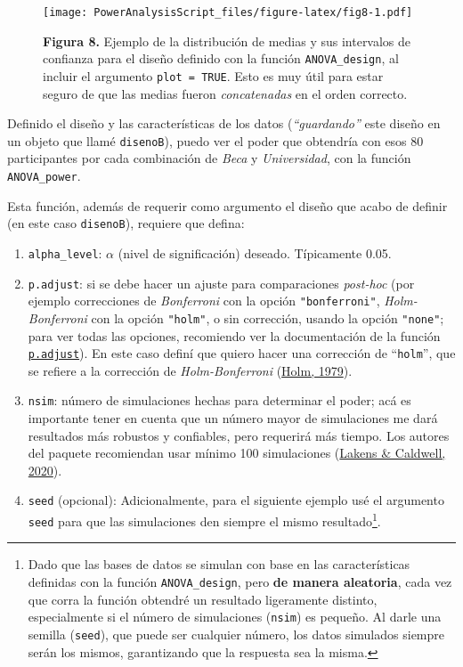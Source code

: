 \documentclass[
]{article}
\providecommand{\tightlist}{%
  \setlength{\itemsep}{0pt}\setlength{\parskip}{0pt}}
\begin{document}
\begin{figure}
\centering
\texttt{[image: PowerAnalysisScript\_files/figure-latex/fig8-1.pdf]}
\caption{\textbf{Figura 8.} Ejemplo de la distribución de medias y sus
intervalos de confianza para el diseño definido con la función
\texttt{ANOVA\_design}, al incluir el argumento \texttt{plot\ =\ TRUE}.
Esto es muy útil para estar seguro de que las medias fueron
\emph{concatenadas} en el orden correcto.}
\end{figure}

Definido el diseño y las características de los datos
(\emph{``guardando''} este diseño en un objeto que llamé
\texttt{disenoB}), puedo ver el poder que obtendría con esos 80
participantes por cada combinación de \emph{Beca} y \emph{Universidad},
con la función \texttt{ANOVA\_power}.

Esta función, además de requerir como argumento el diseño que acabo de
definir (en este caso \texttt{disenoB}), requiere que defina:

\begin{enumerate}
\def\labelenumi{\arabic{enumi}.}
\tightlist
\item
  \texttt{alpha\_level}: \(\alpha\) (nivel de significación) deseado.
  Típicamente 0.05.
\item
  \texttt{p.adjust}: si se debe hacer un ajuste para comparaciones
  \emph{post-hoc} (por ejemplo correcciones de \emph{Bonferroni} con la
  opción \texttt{"bonferroni"}, \emph{Holm-Bonferroni} con la opción
  \texttt{"holm"}, o sin corrección, usando la opción \texttt{"none"};
  para ver todas las opciones, recomiendo ver la documentación de la
  función
  \href{https://www.rdocumentation.org/packages/stats/versions/3.6.2/topics/p.adjust}{\texttt{p.adjust}}).
  En este caso definí que quiero hacer una corrección de
  ``\texttt{holm}'', que se refiere a la corrección de
  \emph{Holm-Bonferroni}
  (\protect\hyperlink{ref-holmSimpleSequentiallyRejective1979a}{Holm,
  1979}).
\item
  \texttt{nsim}: número de simulaciones hechas para determinar el poder;
  acá es importante tener en cuenta que un número mayor de simulaciones
  me dará resultados más robustos y confiables, pero requerirá más
  tiempo. Los autores del paquete recomiendan usar mínimo 100
  simulaciones
  (\protect\hyperlink{ref-lakensIntroductionSuperpower2020}{Lakens \&
  Caldwell, 2020}).
\item
  \texttt{seed} (opcional): Adicionalmente, para el siguiente ejemplo
  usé el argumento \texttt{seed} para que las simulaciones den siempre
  el mismo resultado\footnote{Dado que las bases de datos se simulan con
    base en las características definidas con la función
    \texttt{ANOVA\_design}, pero \textbf{de manera aleatoria}, cada vez
    que corra la función obtendré un resultado ligeramente distinto,
    especialmente si el número de simulaciones (\texttt{nsim}) es
    pequeño. Al darle una semilla (\texttt{seed}), que puede ser
    cualquier número, los datos simulados siempre serán los mismos,
    garantizando que la respuesta sea la misma.}.
\end{enumerate}
\end{document}
